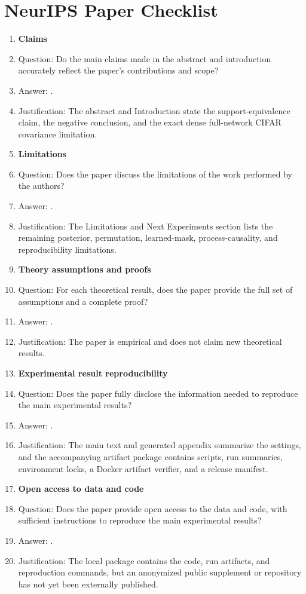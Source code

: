\section*{NeurIPS Paper Checklist}

\begin{enumerate}
\item {\bf Claims}
    \item[] Question: Do the main claims made in the abstract and introduction accurately reflect the paper's contributions and scope?
    \item[] Answer: \answerYes{}.
    \item[] Justification: The abstract and Introduction state the support-equivalence claim, the negative conclusion, and the exact dense full-network CIFAR covariance limitation.

\item {\bf Limitations}
    \item[] Question: Does the paper discuss the limitations of the work performed by the authors?
    \item[] Answer: \answerYes{}.
    \item[] Justification: The Limitations and Next Experiments section lists the remaining posterior, permutation, learned-mask, process-causality, and reproducibility limitations.

\item {\bf Theory assumptions and proofs}
    \item[] Question: For each theoretical result, does the paper provide the full set of assumptions and a complete proof?
    \item[] Answer: \answerNA{}.
    \item[] Justification: The paper is empirical and does not claim new theoretical results.

\item {\bf Experimental result reproducibility}
    \item[] Question: Does the paper fully disclose the information needed to reproduce the main experimental results?
    \item[] Answer: \answerYes{}.
    \item[] Justification: The main text and generated appendix summarize the settings, and the accompanying artifact package contains scripts, run summaries, environment locks, a Docker artifact verifier, and a release manifest.

\item {\bf Open access to data and code}
    \item[] Question: Does the paper provide open access to the data and code, with sufficient instructions to reproduce the main experimental results?
    \item[] Answer: \answerNo{}.
    \item[] Justification: The local package contains the code, run artifacts, and reproduction commands, but an anonymized public supplement or repository has not yet been externally published.


\end{enumerate}
